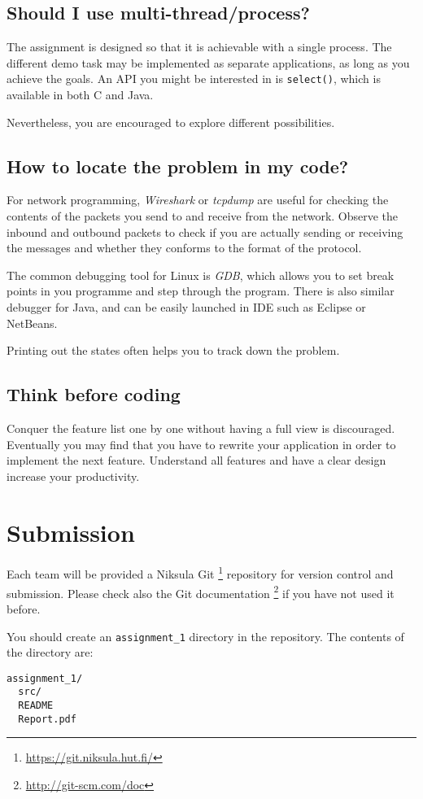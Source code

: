 \documentclass[12pt, a4paper]{article}
\begin{document}
\subsection*{Should I use multi-thread/process?}
The assignment is designed so that it is achievable with a single process.
The different demo task may be implemented as separate applications, as long as you achieve the goals.
An API you might be interested in is \texttt{select()}, which is available in both C and Java.

Nevertheless, you are encouraged to explore different possibilities.

\subsection*{How to locate the problem in my code?}
For network programming, \emph{Wireshark} or \emph{tcpdump} are useful for checking the contents of the packets you send to and receive from the network.
Observe the inbound and outbound packets to check if you are actually sending or receiving the messages and whether they conforms to the format of the protocol.

The common debugging tool for Linux is \emph{GDB}, which allows you to set break points in you programme and step through the program.
There is also similar debugger for Java, and can be easily launched in IDE such as Eclipse or NetBeans.

Printing out the states often helps you to track down the problem.

\subsection*{Think before coding}
Conquer the feature list one by one without having a full view is discouraged.
Eventually you may find that you have to rewrite your application in order to implement the next feature.
Understand all features and have a clear design increase your productivity.


\section{Submission}
Each team will be provided a Niksula Git \footnote{\url{https://git.niksula.hut.fi/}} repository for version control and submission.
Please check also the Git documentation \footnote{\url{http://git-scm.com/doc}} if you have not used it before.

You should create an \texttt{assignment\_1} directory in the repository.
The contents of the directory are:
\begin{verbatim}
assignment_1/
  src/
  README
  Report.pdf
\end{verbatim}
\end{document}
